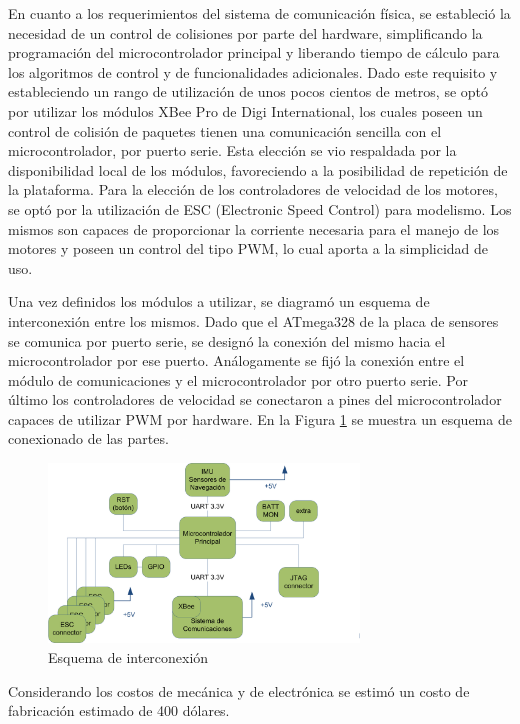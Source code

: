 \documentclass[a4paper, conference]{IEEEtran}
\begin{document}
En cuanto a los requerimientos del sistema de comunicación física, se estableció la necesidad de un control de colisiones por parte del hardware, simplificando la programación del microcontrolador principal y liberando tiempo de cálculo para los algoritmos de control y de funcionalidades adicionales. Dado este requisito y estableciendo un rango de utilización de unos pocos cientos de metros, se optó por utilizar los módulos XBee Pro de Digi International, los cuales poseen un control de colisión de paquetes tienen una comunicación sencilla con el microcontrolador, por puerto serie. Esta elección se vio respaldada por la disponibilidad local de los módulos, favoreciendo a la posibilidad de repetición de la plataforma.
Para la elección de los controladores de velocidad de los motores, se optó por la utilización de ESC (Electronic Speed Control) para modelismo. Los mismos son capaces de proporcionar la corriente necesaria para el manejo de los motores y poseen un control del tipo PWM, lo cual aporta a la simplicidad de uso.

Una vez definidos los módulos a utilizar, se diagramó un esquema de interconexión entre los mismos. Dado que el ATmega328 de la placa de sensores se comunica por puerto serie, se designó la conexión del mismo hacia el microcontrolador por ese puerto. Análogamente se fijó la conexión entre el módulo de comunicaciones y el microcontrolador por otro puerto serie. Por último los controladores de velocidad se conectaron a pines del microcontrolador capaces de utilizar PWM por hardware. En la Figura \ref{ref:conexiones} se muestra un esquema de conexionado de las partes.
	
\begin{figure}[btp]
\centering
\includegraphics[width=3.25in]{interconexion.png}
\caption{Esquema de interconexión}
\label{ref:conexiones}
\end{figure}

Considerando los costos de mecánica y de electrónica se estimó un costo de fabricación estimado de 400 dólares.
\end{document}
